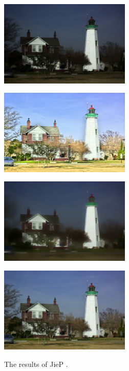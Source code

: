 \begin{figure}[tb]
	\begin{minipage}[b]{0.5\hsize}
		\centering
		\includegraphics[width=62.5mm]{images/jiep/input.eps}
		 \label{fig:jiep/input}
	\end{minipage}
	\begin{minipage}[b]{0.5\hsize}
		\centering
		\includegraphics[width=62.5mm]{images/jiep/reflectance.eps}
		 \label{fig:jiep/reflectance}
	\end{minipage}
	\begin{minipage}[b]{0.5\hsize}
		\centering
		\includegraphics[width=62.5mm]{images/jiep/illumination.eps}
		 \label{fig:jiep/illumination}
	\end{minipage}
	\begin{minipage}[b]{0.5\hsize}
		\centering
		\includegraphics[width=62.5mm]{images/jiep/output.eps}
		 \label{fig:jiep/output}
	\end{minipage}
	\caption{The results of JieP \cite{jiep}.}
	\label{fig:jiep/example}
\end{figure}

